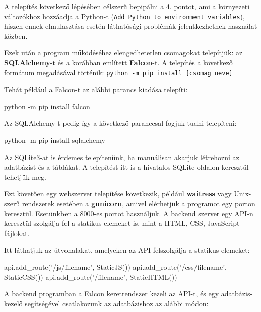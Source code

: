 A telepítés következő lépésében célszerű bepipálni a 4. pontot, ami a környezeti változókhoz hozzáadja a Python-t (\texttt{Add Python to environment variables}), hiszen ennek elmulasztása esetén láthatósági problémák jelentkezhetnek használat közben.


Ezek után a program működéséhez elengedhetetlen csomagokat telepítjük: az \textbf{SQLAlchemy}-t és a korábban említett \textbf{Falcon}-t. A telepítés a következő formátum megadásával történik: \texttt{python -m pip install [csomag neve]}

Tehát például a Falcon-t az alábbi parancs kiadása telepíti:

\begin{python}
python -m pip install falcon
\end{python}

Az SQLAlchemy-t pedig így a következő paranccsal fogjuk tudni telepíteni:
\begin{python}
python -m pip install sqlalchemy
\end{python}

Az SQLite3-at is érdemes telepítenünk, ha manuálisan akarjuk létrehozni az adatbázist és a táblákat. A telepítést itt is a hivatalos SQLite oldalon\cite{sqlite} keresztül tehetjük meg.

Ezt követően egy webszerver telepítése következik, például \textbf{waitress} vagy Unix-szerű rendszerek esetében a \textbf{gunicorn}, amivel elérhetjük a programot egy porton keresztül. Esetünkben a 8000-es portot használjuk. A backend szerver egy API-n keresztül szolgálja fel a statikus elemeket is, mint a HTML, CSS, JavaScript fájlokat.
 
Itt láthatjuk az útvonalakat, amelyeken az API felszolgálja a statikus elemeket:

\begin{python}
api.add_route('/js/{filename}', StaticJS())
api.add_route('/css/{filename}', StaticCSS())
api.add_route('/{filename}', StaticHTML())
\end{python}

A backend programban a Falcon keretrendszer kezeli az API-t, és egy adatbázis-kezelő segítségével csatlakozunk az adatbázishoz az alábbi módon:

